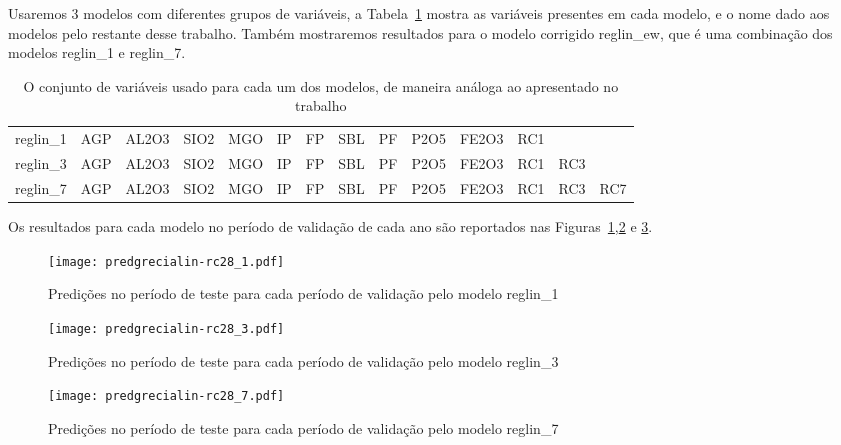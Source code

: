 Usaremos 3 modelos com diferentes grupos de variáveis, a Tabela~\ref{tab:modelslin} mostra
as variáveis presentes em cada modelo, e o nome dado aos modelos pelo restante
desse trabalho. Também mostraremos resultados para o modelo corrigido
reglin\_ew, que é uma combinação dos modelos reglin\_1 e reglin\_7.


\begin{table}[]
\centering 
\begin{tabular}{llllllllllllll}
\toprule
reglin\_1 &  AGP &  AL2O3 &  SIO2 &  MGO &  IP &  FP &  SBL &  PF &  P2O5 &  FE2O3 &  RC1 &      &      \\
reglin\_3 &  AGP &  AL2O3 &  SIO2 &  MGO &  IP &  FP &  SBL &  PF &  P2O5 &  FE2O3 &  RC1 &  RC3 &      \\
reglin\_7 &  AGP &  AL2O3 &  SIO2 &  MGO &  IP &  FP &  SBL &  PF &  P2O5 &  FE2O3 &  RC1 &  RC3 &  RC7 \\
\bottomrule
\end{tabular}
\caption{O conjunto de variáveis usado para cada um dos modelos, de maneira análoga ao apresentado no trabalho \cite{grecialin}}
\label{tab:modelslin}
\end{table}

Os resultados para cada modelo no período de validação de cada ano são
reportados nas Figuras~\ref{fig:rc281preds},\ref{fig:rc283preds} e \ref{fig:rc287preds}.

\begin{figure}[H]
  \centering
  \texttt{[image: predgrecialin-rc28\_1.pdf]}
  \caption{Predições no período de teste para cada período de validação pelo
    modelo reglin\_1}
  \label{fig:rc281preds}
\end{figure}

\begin{figure}[H]
  \centering
  \texttt{[image: predgrecialin-rc28\_3.pdf]}
  \caption{Predições no período de teste para cada período de validação pelo
    modelo reglin\_3}
  \label{fig:rc283preds}

\end{figure}
\begin{figure}[H]
  \centering
  \texttt{[image: predgrecialin-rc28\_7.pdf]}
  \caption{Predições no período de teste para cada período de validação pelo
    modelo reglin\_7}
  \label{fig:rc287preds}

\end{figure}

